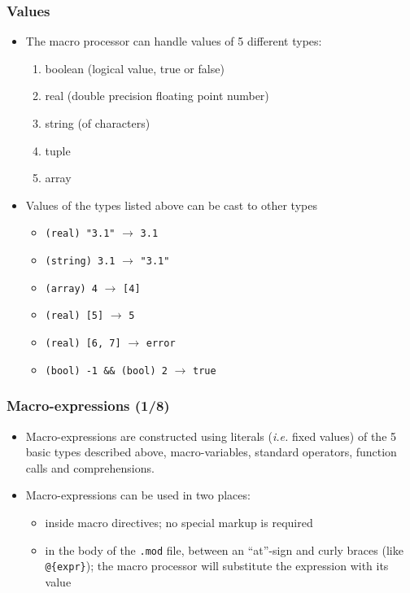 \documentclass[aspectratio=169]{beamer}
\begin{document}
\begin{frame}
\frametitle{Values}
\begin{itemize}
\item The macro processor can handle values of 5 different types:
  \begin{enumerate}
  \item boolean (logical value, true or false)
  \item real (double precision floating point number)
  \item string (of characters)
  \item tuple
  \item array
  \end{enumerate}
\item Values of the types listed above can be cast to other types
  \begin{itemize}
  \item \texttt{(real) "3.1"} $\rightarrow$ \texttt{3.1}
  \item \texttt{(string) 3.1} $\rightarrow$ \texttt{"3.1"}
  \item \texttt{(array) 4} $\rightarrow$ \texttt{[4]}
  \item \texttt{(real) [5]} $\rightarrow$ \texttt{5}
  \item \texttt{(real) [6, 7]} $\rightarrow$ \texttt{error}
  \item \texttt{(bool) -1 \&\& (bool) 2} $\rightarrow$ \texttt{true}
  \end{itemize}
\end{itemize}
\end{frame}

\begin{frame}[fragile=singleslide]
  \frametitle{Macro-expressions (1/8)}
  \begin{itemize}
    \item Macro-expressions are constructed using literals (\textit{i.e.} fixed values) of the 5 basic types
      described above, macro-variables, standard operators, function calls and comprehensions.
    \item Macro-expressions can be used in two places:
      \begin{itemize}
      \item inside macro directives; no special markup is required
      \item in the body of the \texttt{.mod} file, between an ``at''-sign and curly braces (like \verb+@{expr}+); the macro processor will substitute the expression with its value
      \end{itemize}
  \end{itemize}
\end{frame}
\end{document}
